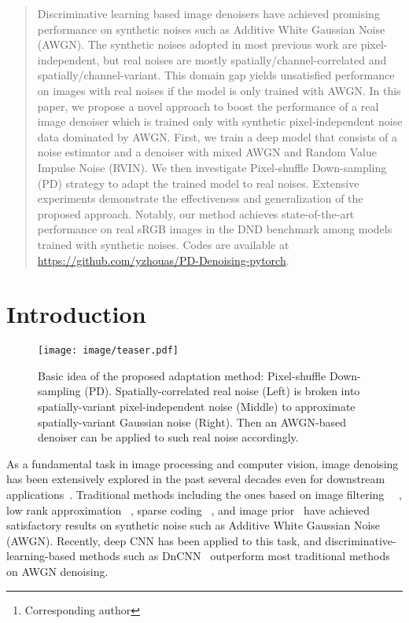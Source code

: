 \documentclass[letterpaper]{article} \usepackage{aaai20}  \usepackage{times}  \usepackage{helvet} \usepackage{courier}  \usepackage{comment}
\author{
{Yuqian Zhou, Jianbo Jiao\thanks{Corresponding author}, Haibin Huang, Yang Wang, Jue Wang, Honghui Shi, Thomas Huang}\\
{\small IFP Group, UIUC~~~ University of Oxford ~~~ Megvii Research ~~~ Stony Brook}\\
{\tt\small \{yuqian2, t-huang1\}@illinois.edu}
}
\begin{document}
\maketitle

\begin{abstract}
Discriminative learning based image denoisers have achieved promising performance on synthetic noises such as Additive White Gaussian Noise (AWGN). The synthetic noises adopted in most previous work are pixel-independent, but real noises are mostly spatially/channel-correlated and spatially/channel-variant. This domain gap yields unsatisfied performance on images with real noises if the model is only trained with AWGN. In this paper, we propose a novel approach to boost the performance of a real image denoiser which is trained only with synthetic pixel-independent noise data dominated by AWGN. First, we train a deep model that consists of a noise estimator and a denoiser with mixed AWGN and Random Value Impulse Noise (RVIN). We then investigate Pixel-shuffle Down-sampling (PD) strategy to adapt the trained model to real noises. Extensive experiments demonstrate the effectiveness and generalization of the proposed approach. Notably, our method achieves state-of-the-art performance on real sRGB images in the DND benchmark among models trained with synthetic noises. Codes are available at \url{https://github.com/yzhouas/PD-Denoising-pytorch}.
\end{abstract}
 \section{Introduction}
\begin{figure}[t]
	\begin{center}
		\texttt{[image: image/teaser.pdf]}
	\end{center}
\caption{Basic idea of the proposed adaptation method: Pixel-shuffle Down-sampling (PD). Spatially-correlated real noise (Left) is broken into spatially-variant pixel-independent noise (Middle) to approximate spatially-variant Gaussian noise (Right). Then an AWGN-based denoiser can be applied to such real noise accordingly.}
	\label{fig:noise_comp}
\end{figure}
As a fundamental task in image processing and computer vision,  image denoising has been extensively explored in the past several decades even for downstream applications~\cite{zhou2018survey,wang2019video}. Traditional methods including the ones based on image filtering ~~\cite{dabov2008image}, low rank approximation ~\cite{gu2014weighted,xu2017multi,yair2018multi}, sparse coding ~\cite{elad2006image}, and image prior~\cite{ulyanov2017deep} have achieved satisfactory results on synthetic noise such as Additive White Gaussian Noise (AWGN). Recently, deep CNN has been applied to this task, and discriminative-learning-based methods such as DnCNN~\cite{zhang2017beyond} outperform most traditional methods on AWGN denoising.
\end{document}
